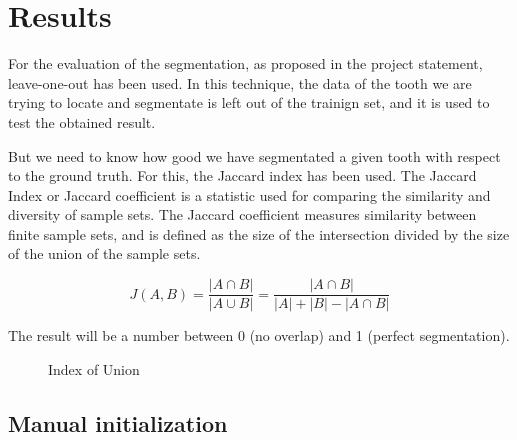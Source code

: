 \section{Results}

For the evaluation of the segmentation, as proposed in the
project statement, leave-one-out has been used. In this technique,
the data of the tooth we are trying to locate and segmentate is left
out of the trainign set, and it is used to test the obtained result.

But we need to know how good we have segmentated a given tooth with
respect to the ground truth. For this, the Jaccard index has been used.
The Jaccard Index or Jaccard coefficient is a statistic used for
comparing the similarity and diversity of
sample sets. The Jaccard coefficient measures similarity between
finite sample sets, and is defined as the size of the intersection
divided by the size of the union of the sample sets.

$$ J(A,B) =  \frac{|A \cap B|}{|A \cup B|} = \frac{|A \cap B|}{|A| + |B| - |A \cap B|} $$

The result will be a number between 0 (no overlap) and
1 (perfect segmentation).

 \begin{figure} \centering
  \caption{Index of Union}
\end{figure}

\subsection{Manual initialization}

